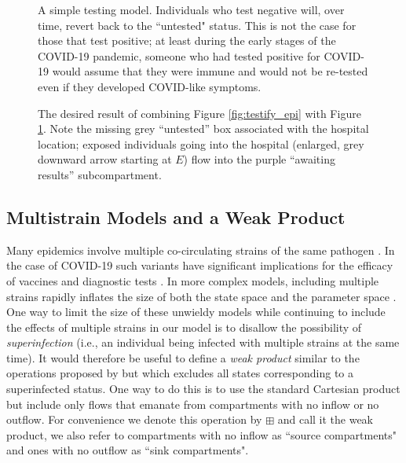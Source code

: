 \begin{figure}
    \centering
    
    \caption{A simple testing model. Individuals who test negative will, over time, revert back to the ``untested" status. This is not the case for those that test positive; at least during the early stages of the COVID-19 pandemic, someone who had tested positive for COVID-19 would assume that they were immune and would not be re-tested even if they developed COVID-like symptoms.}
    \label{fig:testify_states}
\end{figure}

\begin{figure}
    \centering
    
    \caption{The desired result of combining Figure \ref{fig:testify_epi} with Figure \ref{fig:testify_states}. Note the missing grey ``untested'' box associated with the hospital location; exposed individuals going into the hospital (enlarged, grey downward arrow starting at $E$) flow into the purple ``awaiting results'' subcompartment.}
    \label{fig:testify_desired}
\end{figure}

\FloatBarrier


\subsection{Multistrain Models and a Weak Product}\label{wp}
Many epidemics involve multiple co-circulating strains of the same pathogen \citep{gog2002dynamics, williams2021localization}. In the case of COVID-19 such variants have significant implications for the efficacy of vaccines \citep{abu2021effectiveness, koyama2020emergence} and diagnostic tests \citep{vasireddy2021review}. In more complex models, including multiple strains rapidly inflates the size of both the state space and the parameter space \citep{kryazhimskiy2007state}. One way to limit the size of these unwieldy models while continuing to include the effects of multiple strains in our model is to disallow the possibility of \emph{superinfection} (i.e., an individual being infected with multiple strains at the same time). It would therefore be useful to define a \emph{weak product} similar to the operations proposed by \cite{worden2017products} but which excludes all states corresponding to a superinfected status. One way to do this is to use the standard Cartesian product but include only flows that emanate from compartments with no inflow or no outflow. For convenience we denote this operation by $\boxplus$ and call it the weak product, we also refer to compartments with no inflow as ``source compartments" and ones with no outflow as ``sink compartments". 

